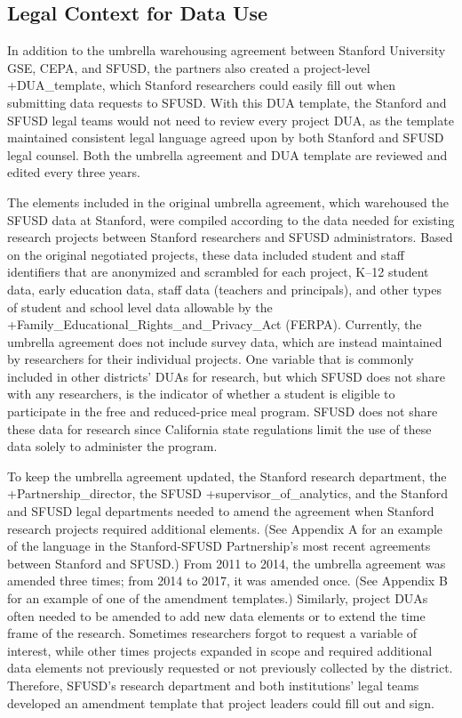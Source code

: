 \documentclass[
]{book}
\begin{document}
\hypertarget{legal-context-for-data-use-5}{%
\subsection{Legal Context for Data Use}\label{legal-context-for-data-use-5}}

In addition to the umbrella warehousing agreement between Stanford University GSE, CEPA, and SFUSD, the partners also created a project-level +DUA\_template\textbar, which Stanford researchers could easily fill out when submitting data requests to SFUSD. With this DUA template, the Stanford and SFUSD legal teams would not need to review every project DUA, as the template maintained consistent legal language agreed upon by both Stanford and SFUSD legal counsel. Both the umbrella agreement and DUA template are reviewed and edited every three years.

The elements included in the original umbrella agreement, which warehoused the SFUSD data at Stanford, were compiled according to the data needed for existing research projects between Stanford researchers and SFUSD administrators. Based on the original negotiated projects, these data included student and staff identifiers that are anonymized and scrambled for each project, K--12 student data, early education data, staff data (teachers and principals), and other types of student and school level data allowable by the +Family\_Educational\_Rights\_and\_Privacy\_Act\textbar{} (FERPA). Currently, the umbrella agreement does not include survey data, which are instead maintained by researchers for their individual projects. One variable that is commonly included in other districts' DUAs for research, but which SFUSD does not share with any researchers, is the indicator of whether a student is eligible to participate in the free and reduced-price meal program. SFUSD does not share these data for research since California state regulations limit the use of these data solely to administer the program.

To keep the umbrella agreement updated, the Stanford research department, the +Partnership\_director\textbar, the SFUSD +supervisor\_of\_analytics\textbar, and the Stanford and SFUSD legal departments needed to amend the agreement when Stanford research projects required additional elements. (See Appendix A for an example of the language in the Stanford-SFUSD Partnership's most recent agreements between Stanford and SFUSD.) From 2011 to 2014, the umbrella agreement was amended three times; from 2014 to 2017, it was amended once. (See Appendix B for an example of one of the amendment templates.) Similarly, project DUAs often needed to be amended to add new data elements or to extend the time frame of the research. Sometimes researchers forgot to request a variable of interest, while other times projects expanded in scope and required additional data elements not previously requested or not previously collected by the district. Therefore, SFUSD's research department and both institutions' legal teams developed an amendment template that project leaders could fill out and sign.
\end{document}
